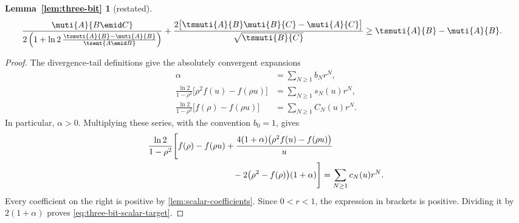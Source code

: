 \begingroup
\newtheorem*{restatedthreebit}{Lemma~\ref{lem:three-bit}}
\begin{restatedthreebit}[restated]
\begin{align*}
  &\frac{\muti{A}{B\emid C}}
  {2\left(1+\ln2\,
  \frac{\tsmuti{A}{B}-\muti{A}{B}}{\tsent{A\emid B}}\right)}
  +
  \frac{2\bigl[\tsmuti{A}{B}\muti{B}{C}-\muti{A}{C}\bigr]}
  {\sqrt{\tsmuti{B}{C}}}
  \ge\tsmuti{A}{B}-\muti{A}{B}.
\end{align*}
\end{restatedthreebit}
\endgroup
\begin{proof}
The divergence-tail definitions give the absolutely convergent expansions
\begin{align*}
  \alpha&=\sum_{N\ge1}b_Nr^N,\\
  \frac{\ln2}{1-\rho^2}
  \bigl[\rho^2 f(u)-f(\rho u)\bigr]
  &=\sum_{N\ge1}s_N(u)r^N,\\
  \frac{\ln2}{1-\rho^2}
  \bigl[f(\rho)-f(\rho u)\bigr]
  &=\sum_{N\ge1}C_N(u)r^N.
\end{align*}
In particular, $\alpha>0$.
Multiplying these series, with the convention $b_0=1$, gives
\begin{equation*}
  \begin{aligned}
    &\frac{\ln2}{1-\rho^2}\Biggl[
    f(\rho)-f(\rho u)
    +\frac{4(1+\alpha)\bigl(\rho^2 f(u)-f(\rho u)\bigr)}u\\
    &\hspace{35mm}
    -2\bigl(\rho^2-f(\rho)\bigr)(1+\alpha)\Biggr]
    =\sum_{N\ge1}c_N(u)r^N.
  \end{aligned}
\end{equation*}
Every coefficient on the right is positive by
\autoref{lem:scalar-coefficients}. Since $0<r<1$, the expression
in brackets is positive. Dividing it by $2(1+\alpha)$ proves
\eqref{eq:three-bit-scalar-target}.
\end{proof}

